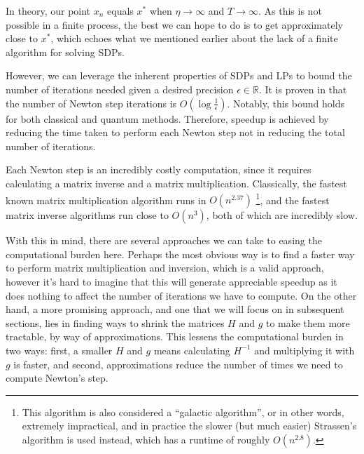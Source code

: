 \documentclass[11pt]{article}
\begin{document}
	In theory, our point \( x_n \) equals \( x^{*} \) when \( \eta \to \infty \) and \( T \to \infty \). 
	As this is not possible 
	in a finite process, the best we can hope to do is to get approximately close to \( x^{*} \), which echoes 
	what we mentioned earlier about the lack of a finite algorithm for solving SDPs. 

 However, we can leverage the inherent properties of SDPs and LPs to bound the number of iterations needed given a desired precision $\epsilon\in\mathbb{R}$. It is proven in \cite{boydConvexOptimization2004} that the number of Newton step iterations is $O(\log \frac{1}{\epsilon})$. Notably, this bound holds for both classical and quantum methods. Therefore, speedup is achieved by reducing the time taken to perform each Newton step not in reducing the total number of iterations.

     Each Newton step is an 
	incredibly costly computation, since it requires calculating a matrix inverse and a matrix multiplication. 
	Classically, the fastest known matrix multiplication algorithm runs in \( O(n^{2.37}) \)
	\footnote{This algorithm 
		is also considered a ``galactic algorithm'', or in other words, extremely impractical, and in practice 
		the slower (but much easier) Strassen's algorithm is used instead, which has a runtime of roughly 
	\( O(n^{2.8}) \).}, and the fastest matrix inverse algorithms run close to \( O(n^3) \), both of which are 
	incredibly slow.  

	With this in mind, there are several approaches we can take to easing the computational burden here. Perhaps 
	the most obvious way is to find a faster way to perform matrix multiplication and inversion, which is a valid 
	approach, however it's hard to imagine that this will generate appreciable speedup as it does nothing to affect 
	the number of iterations we have to compute. On the other hand, 
	a more promising approach, and one that we will focus on 
	in subsequent sections, lies in finding ways to shrink the matrices \( H \) and \( g \) to make them more 
	tractable, by way of approximations. This lessens the computational burden in two ways: first, a smaller \( H \)
	and \( g \) means calculating \( H^{-1} \) and multiplying it with \( g \) is faster, and second, 
	approximations reduce the number of times we need to compute Newton's step. 
\end{document}
